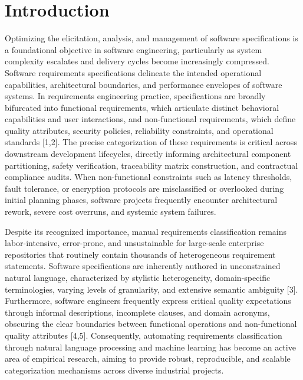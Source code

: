 \section{Introduction}
Optimizing the elicitation, analysis, and management of software specifications is a foundational objective in software engineering, particularly as system complexity escalates and delivery cycles become increasingly compressed. Software requirements specifications delineate the intended operational capabilities, architectural boundaries, and performance envelopes of software systems. In requirements engineering practice, specifications are broadly bifurcated into functional requirements, which articulate distinct behavioral capabilities and user interactions, and non-functional requirements, which define quality attributes, security policies, reliability constraints, and operational standards [1,2]. The precise categorization of these requirements is critical across downstream development lifecycles, directly informing architectural component partitioning, safety verification, traceability matrix construction, and contractual compliance audits. When non-functional constraints such as latency thresholds, fault tolerance, or encryption protocols are misclassified or overlooked during initial planning phases, software projects frequently encounter architectural rework, severe cost overruns, and systemic system failures.

Despite its recognized importance, manual requirements classification remains labor-intensive, error-prone, and unsustainable for large-scale enterprise repositories that routinely contain thousands of heterogeneous requirement statements. Software specifications are inherently authored in unconstrained natural language, characterized by stylistic heterogeneity, domain-specific terminologies, varying levels of granularity, and extensive semantic ambiguity [3]. Furthermore, software engineers frequently express critical quality expectations through informal descriptions, incomplete clauses, and domain acronyms, obscuring the clear boundaries between functional operations and non-functional quality attributes [4,5]. Consequently, automating requirements classification through natural language processing and machine learning has become an active area of empirical research, aiming to provide robust, reproducible, and scalable categorization mechanisms across diverse industrial projects.

